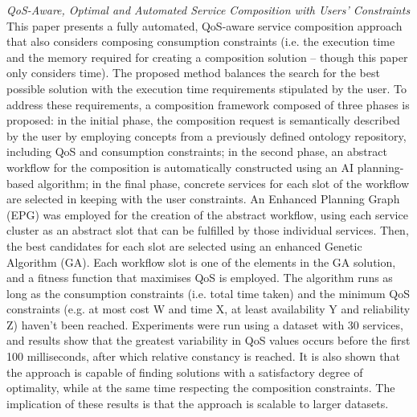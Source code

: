 \textit{QoS-Aware, Optimal and Automated Service Composition with Users' Constraints \cite{xiang2011qos}}\\
This paper presents a fully automated, QoS-aware service composition approach that also considers composing consumption constraints (i.e. the execution time and the memory required
for creating a composition solution -- though this paper only considers time). The proposed method balances the search for the best possible solution with the execution time
requirements stipulated by the user. To address these requirements, a composition framework composed of three phases is proposed: in the initial phase, the composition request is
semantically described by the user by employing concepts from a previously defined ontology repository, including QoS and consumption constraints; in the second phase, an abstract workflow for the composition is automatically constructed using an AI planning-based algorithm; in the final phase, concrete services for each slot of the workflow are selected
in keeping with the user constraints. An Enhanced Planning Graph (EPG) was employed for the creation of the abstract workflow, using each service cluster as an abstract slot that
can be fulfilled by those individual services. Then, the best candidates for each slot are selected using an enhanced Genetic Algorithm (GA). Each workflow slot is one of the elements
in the GA solution, and a fitness function that maximises QoS is employed. The algorithm runs as long as the consumption constraints (i.e. total time taken) and the minimum QoS constraints (e.g. at most cost W and time X, at least availability Y and reliability Z) haven't been reached. Experiments were run using a dataset with 30 services, and results
show that the greatest variability in QoS values occurs before the first 100 milliseconds, after which relative constancy is reached. It is also shown that the approach is capable
of finding solutions with a satisfactory degree of optimality, while at the same time respecting the composition constraints. The implication of these results is that the approach is scalable to larger datasets.

